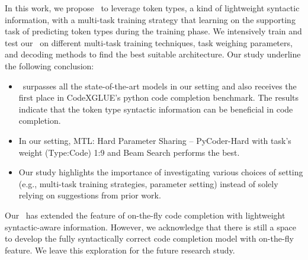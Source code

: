 
In this work, we propose \our~to leverage token types, a kind of lightweight syntactic information, with a multi-task training strategy that learning on the supporting task of predicting token types during the training phase.
We intensively train and test our \our~on different multi-task training techniques, task weighing parameters, and decoding methods to find the best suitable architecture.
Our study underline the following conclusion:
\begin{itemize}
    \item \our~surpasses all the state-of-the-art models in our setting and also receives the first place in CodeXGLUE’s python code completion benchmark. The results indicate that the token type syntactic information can be beneficial in code completion.
    \item In our setting, MTL: Hard Parameter Sharing -- PyCoder-Hard with task's weight (Type:Code) 1:9 and Beam Search performs the best. 
    \item  Our study highlights the importance of investigating various choices of setting (e.g., multi-task training strategies, parameter setting) instead of solely relying on suggestions from prior work.
\end{itemize}
Our \our~has extended the feature of on-the-fly code completion with lightweight syntactic-aware information.
However, we acknowledge that there is still a space to develop the fully syntactically correct code completion model with on-the-fly feature.
We leave this exploration for the future research study.

